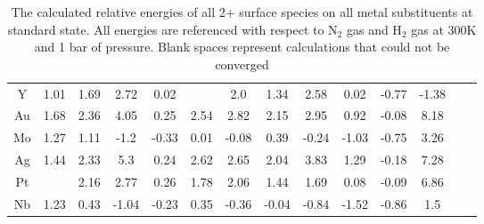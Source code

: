 \begin{table}
\begin{center}
\begin{tabular}{| c | c | c | c | c | c | c | c | c | c | c | c | c | c |}
Y & 1.01 & 1.69 & 2.72 & 0.02 &  & 2.0 & 1.34 & 2.58 & 0.02 & -0.77 & -1.38 \\
Au & 1.68 & 2.36 & 4.05 & 0.25 & 2.54 & 2.82 & 2.15 & 2.95 & 0.92 & -0.08 & 8.18 \\
Mo & 1.27 & 1.11 & -1.2 & -0.33 & 0.01 & -0.08 & 0.39 & -0.24 & -1.03 & -0.75 & 3.26 \\
Ag & 1.44 & 2.33 & 5.3 & 0.24 & 2.62 & 2.65 & 2.04 & 3.83 & 1.29 & -0.18 & 7.28 \\
Pt &  & 2.16 & 2.77 & 0.26 & 1.78 & 2.06 & 1.44 & 1.69 & 0.08 & -0.09 & 6.86 \\
Nb & 1.23 & 0.43 & -1.04 & -0.23 & 0.35 & -0.36 & -0.04 & -0.84 & -1.52 & -0.86 & 1.5 \\
\hline
\end{tabular}
\end{center}
\caption{The calculated relative energies of all 2+ surface species on all metal substituents at standard state. All energies are referenced with respect to N$_2$ gas and H$_2$ gas at 300K and 1 bar of pressure. Blank spaces represent calculations that could not be converged}
\label{table:energies}
\end{table}


